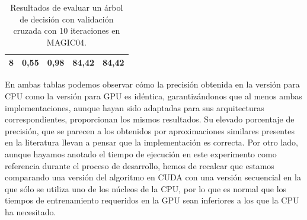 \begin{table}[H]
\begin{tabular}{@{}|c|cc|cc|@{}}
\textbf{8}                                                                                & 0,55                                       & 0,98                                                                     & 84,42                                   & 84,42                                                                  \\ \bottomrule
\end{tabular}
\caption{Resultados de evaluar un árbol de decisión con validación cruzada con 10 iteraciones en MAGIC04.}
\label{tab:magic04}
\end{table}

En ambas tablas podemos observar cómo la precisión obtenida en la versión para CPU como la versión para GPU es idéntica, garantizándonos que al menos ambas implementaciones, aunque hayan sido adaptadas para sus arquitecturas correspondientes, proporcionan los mismos resultados. Su elevado porcentaje de precisión, que se parecen a los obtenidos por aproximaciones similares presentes en la literatura llevan a pensar que la implementación es correcta. Por otro lado, aunque hayamos anotado el tiempo de ejecución en este experimento como referencia durante el proceso de desarrollo, hemos de recalcar que estamos comparando una versión del algoritmo en CUDA con una versión secuencial en la que sólo se utiliza uno de los núcleos de la CPU, por lo que es normal que los tiempos de entrenamiento requeridos en la GPU sean inferiores a los que la CPU ha necesitado.\\

